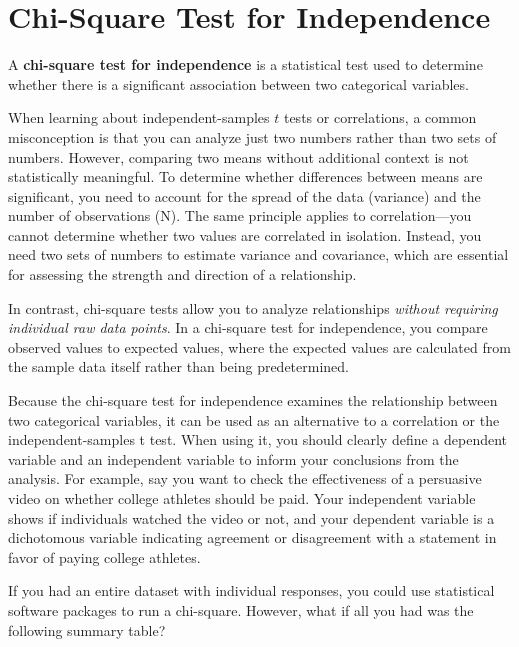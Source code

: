 \documentclass[
  letterpaper,
  DIV=11,
  numbers=noendperiod]{scrreprt}
\begin{document}
\section{Chi-Square Test for
Independence}\label{chi-square-test-for-independence}

A \textbf{chi-square test for independence} is a statistical test used
to determine whether there is a significant association between two
categorical variables.

When learning about independent-samples \(t\) tests or correlations, a
common misconception is that you can analyze just two numbers rather
than two sets of numbers. However, comparing two means without
additional context is not statistically meaningful. To determine whether
differences between means are significant, you need to account for the
spread of the data (variance) and the number of observations (N). The
same principle applies to correlation---you cannot determine whether two
values are correlated in isolation. Instead, you need two sets of
numbers to estimate variance and covariance, which are essential for
assessing the strength and direction of a relationship.

In contrast, chi-square tests allow you to analyze relationships
\emph{without requiring individual raw data points}. In a chi-square
test for independence, you compare observed values to expected values,
where the expected values are calculated from the sample data itself
rather than being predetermined.

Because the chi-square test for independence examines the relationship
between two categorical variables, it can be used as an alternative to a
correlation or the independent-samples t test. When using it, you should
clearly define a dependent variable and an independent variable to
inform your conclusions from the analysis. For example, say you want to
check the effectiveness of a persuasive video on whether college
athletes should be paid. Your independent variable shows if individuals
watched the video or not, and your dependent variable is a dichotomous
variable indicating agreement or disagreement with a statement in favor
of paying college athletes.

If you had an entire dataset with individual responses, you could use
statistical software packages to run a chi-square. However, what if all
you had was the following summary table?
\end{document}
